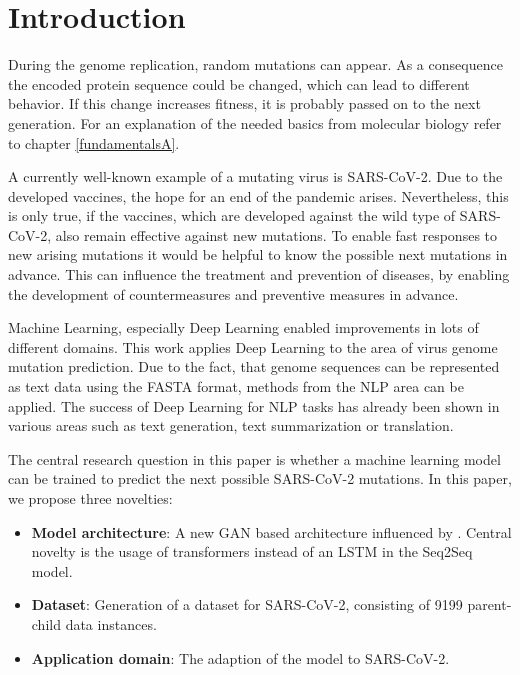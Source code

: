 \section{Introduction} \label{introduction}

During the genome replication, random mutations can appear. As a con\-se\-quence the encoded protein sequence could be changed, which can lead to different behavior. If this change increases fitness, it is probably passed on to the next generation. For an explanation of the needed basics from molecular biology refer to chapter \ref{fundamentalsA}. \cite{Berman2020}

A currently well-known example of a mutating virus is \ac{SARS-CoV-2}. Due to the developed vaccines, the hope for an end of the pandemic arises. Nevertheless, this is only true, if the vaccines, which are developed against the wild type of \ac{SARS-CoV-2}, also remain effective against new mutations. To enable fast responses to new arising mutations it would be helpful to know the possible next mutations in advance. This can influence the treatment and prevention of diseases, by enabling the development of countermeasures and preventive measures in advance. \cite{Berman2020}

Machine Learning, especially Deep Learning enabled improvements in lots of different domains. This work applies Deep Learning to the area of virus genome mutation prediction. Due to the fact, that genome sequences can be represented as text data using the FASTA format, methods from the \ac{NLP} area can be applied. The success of Deep Learning for \ac{NLP} tasks has already been shown in various areas such as text generation, text sum\-ma\-riza\-t\-ion or translation. \cite{Berman2020}

The central research question in this paper is whether a machine learning model can be trained to predict the next possible \ac{SARS-CoV-2} mutations. In this paper, we propose three novelties:

\begin{itemize}
	\item \textbf{Model architecture}: A new \ac{GAN} based architecture influenced by \cite{Berman2020}. Central novelty is the usage of trans\-for\-mers instead of an \ac{LSTM} in the \ac{Seq2Seq} model.
	\item \textbf{Dataset}: Generation of a dataset for \ac{SARS-CoV-2}, consisting of 9199 parent-child data instances. 
	\item \textbf{Application domain}: The adaption of the model to \ac{SARS-CoV-2}.
\end{itemize}

\newpage
